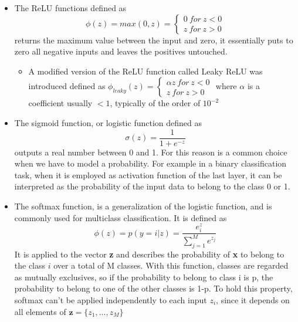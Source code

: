\documentclass[11pt]{report}
\begin{document}
\begin{itemize}

\item The ReLU functions defined as
\begin{equation}
\phi(z) = max(0, z) = \begin{cases} 0 \ for \ z<0 \\ z \ for \ z>0 \end{cases}
\end{equation}
returns the maximum value between the input and zero, it essentially puts to zero all negative inputs and leaves the positives untouched.
\begin{itemize}
\item A modified version of the ReLU function called Leaky ReLU was introduced defined as
$\phi_{leaky}(z) = \begin{cases} \alpha z \ for \ z<0 \\ z \ for \ z>0 \end{cases}$ where $\alpha$ is a coefficient usually $< 1$, typically of the order of $10^{-2}$
\end{itemize}

\item The sigmoid function, or logistic function defined as
\begin{equation}\label{eq:sigmoid}
\sigma (z) = \frac{1}{1+e^{-z}}
\end{equation}
outputs a real number between 0 and 1.
For this reason is a common choice when we have to model a probability.
For example in a binary classification task, when it is employed as activation function of the last layer, it can be interpreted as the probability of the input data to belong to the class 0 or 1.


\item The softmax function, is a generalization of the logistic function, and is commonly used for multiclass classification. It is defined as
\begin{equation}
\phi(z) = p(y = i|z) = \frac{e^z_i}{\sum_{j = 1}^M e^{z_j}}
\end{equation}
It is applied to the vector \textbf{z} and describes the probability of \textbf{x} to belong to the class $i$ over a total of M classes.
With this function, classes are regarded as mutually exclusives, so if the probability to belong to class i is p, the probability to belong to one of the other classes is 1-p.
To hold this property, softmax can't be applied independently to each input $z_i$, since it depends on all elements of $\textbf{z} = \{z_1, ..., z_M\}$
\end{itemize}
\end{document}
